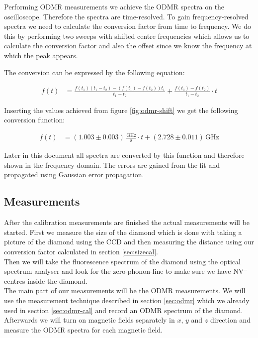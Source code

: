 Performing ODMR measurements we achieve the ODMR spectra on the oscilloscope. Therefore the spectra are time-resolved. To gain frequency-resolved spectra we need to calculate the conversion factor from time to frequency. We do this by performing two sweeps with shifted centre frequencies which allows us to calculate the conversion factor and also the offset since we know the frequency at which the peak appears.

The conversion can be expressed by the following equation:

\begin{align}
f(t)&=\frac{f(t_1)(t_1-t_2)-(f(t_1)-f(t_2))t_1}{t_1-t_2}+\frac{f(t_1)-f(t_2)}{t_1-t_2}\cdot t
\end{align}

Inserting the values achieved from figure \ref{fig:odmr-shift} we get the following conversion function:

\begin{align}
f(t)&=(1.003\pm0.003)\,\mathrm{\frac{GHz}{s}}\cdot t+(2.728\pm0.011)\,\mathrm{GHz}
\end{align}

Later in this document all spectra are converted by this function and therefore shown in the frequency domain. The errors are gained from the fit and propagated using Gaussian error propagation.

\subsection{Measurements}
\label{sec:measurements}
After the calibration measurements are finished the actual measurements will be started. First we measure the size of the diamond which is done with taking a picture of the diamond using the CCD and then measuring the distance using our conversion factor calculated in section \ref{sec:sizecal}.\\

Then we will take the fluorescence spectrum of the diamond using the optical spectrum analyser and look for the zero-phonon-line to make sure we have NV$^-$ centres inside the diamond.\\

The main part of our measurements will be the ODMR measurements. We will use the measurement technique described in section \ref{sec:odmr} which we already used in section \ref{sec:odmr-cal} and record an ODMR spectrum of the diamond. Afterwards we will turn on magnetic fields separately in $x$, $y$ and $z$ direction and measure the ODMR spectra for each magnetic field.